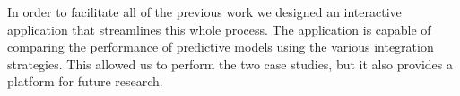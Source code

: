 In order to facilitate all of the previous work we designed an interactive application that streamlines this whole process. The application is capable of comparing the performance of predictive models using the various integration strategies. This allowed us to perform the two case studies, but it also provides a platform for future research. 
